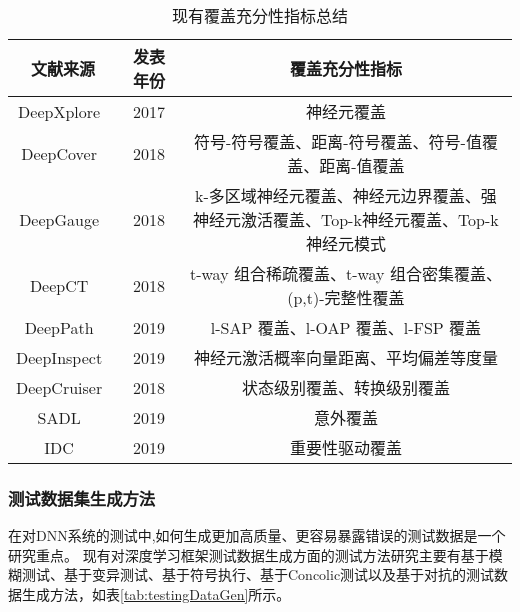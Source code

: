 \begin{table}[t]
	\small
	\centering
	\caption{现有覆盖充分性指标总结}
	\label{tab:coverage_criteria}
	\begin{tabular}{c|c|c}
		\toprule
		文献来源 & 发表年份 & 覆盖充分性指标 \\
		\midrule
		DeepXplore~\citess{Pei2019DeepXplore} & 2017 & 神经元覆盖 \\
		\midrule
	    DeepCover~\citess{Sun2018Testing} & 2018 & 符号-符号覆盖、距离-符号覆盖、符号-值覆盖、距离-值覆盖 \\
		\midrule
		DeepGauge~\citess{ma2018deepgauge} & 2018 & k-多区域神经元覆盖、神经元边界覆盖、强神经元激活覆盖、Top-k神经元覆盖、Top-k 神经元模式 \\
		\midrule
	    DeepCT~\citess{ma2019deepct} & 2018 & t-way 组合稀疏覆盖、t-way 组合密集覆盖、(p,t)-完整性覆盖 \\
	    \midrule
	    DeepPath~\citess{Wang2019DeepPath} & 2019 & l-SAP 覆盖、l-OAP 覆盖、l-FSP 覆盖 \\
	    \midrule
	    DeepInspect~\citess{Tian2019Testing} & 2019 & 神经元激活概率向量距离、平均偏差等度量 \\
	    \midrule
	    DeepCruiser~\citess{Du2018DeepCruiser} & 2018 & 状态级别覆盖、转换级别覆盖 \\
	    \midrule
	    SADL~\citess{Kim2019Guiding} & 2019 & 意外覆盖 \\
	    \midrule
	    IDC~\citess{Gerasimou2020Importance} & 2019 & 重要性驱动覆盖 \\
		\bottomrule
	\end{tabular}
\end{table}



\subsubsection{测试数据集生成方法}


在对DNN系统的测试中,如何生成更加高质量、更容易暴露错误的测试数据是一个研究重点。
现有对深度学习框架测试数据生成方面的测试方法研究主要有基于模糊测试、基于变异测试、基于符号执行、基于Concolic测试以及基于对抗的测试数据生成方法，如表\cref{tab:testingDataGen}所示。

